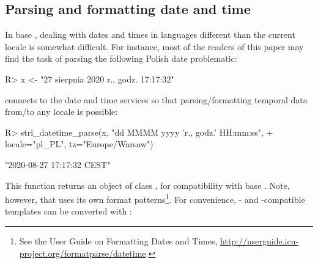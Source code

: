 \documentclass[nojss]{jss}
\begin{document}




%








\subsection{Parsing and formatting date and time}\label{Sec:datetime}

In base , dealing with dates and times in languages
different than the current locale is somewhat difficult.
For instance, most of the readers of this paper
may find the task of parsing the following Polish date problematic:

\begin{Schunk}
\begin{Sinput}
R> x <- "27 sierpnia 2020 r., godz. 17:17:32"
\end{Sinput}
\end{Schunk}

 connects to the  date and time
services  so that parsing/formatting temporal data from/to any locale
is possible:


\begin{Schunk}
\begin{Sinput}
R> stri_datetime_parse(x, "dd MMMM yyyy 'r., godz.' HH:mm:ss",
+      locale="pl_PL", tz="Europe/Warsaw")
\end{Sinput}
\begin{Soutput}
[1] "2020-08-27 17:17:32 CEST"
\end{Soutput}
\end{Schunk}

This function returns an object of class ,
for compatibility with base .
Note, however, that
 uses its own format patterns\footnote{
See the  User Guide on {Formatting Dates and Times},
\url{http://userguide.icu-project.org/formatparse/datetime}.
}. For convenience,
- and -compatible
templates can be converted with :
\end{document}
